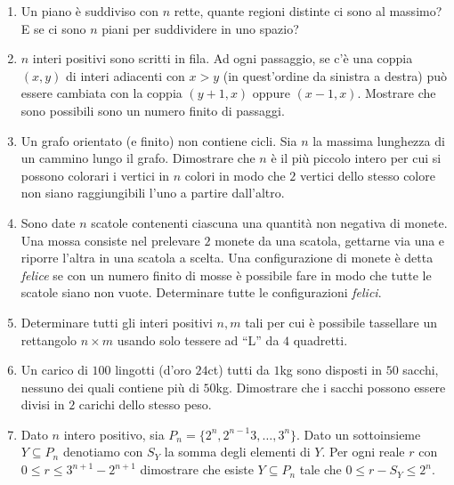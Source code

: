 \documentclass[a4paper,10pt]{article}
\begin{document}
\begin{enumerate}
	Nel mese di febbraio, tocca allo gnome Febbraio fare visita ai
	suoi amici ed eventualmente ridipingere la casetta per
	``adeguarsi alla maggioranza'', e cos\`{\i} via.

	Questa procedura si ripete di anno in anno.  Si dimostri che, da
	un certo momento in poi, nessuno gnomo avr\`{a} pi\`{u} bisogno di
	ridipingere la sua casetta (si supponga l'amicizia simmetrica, e che
	ogni gnomo non includa se stesso nella lista dei suoi amici).

	\item Un piano è suddiviso con $n$ rette, quante regioni distinte ci
	sono al massimo? E se ci sono $n$ piani per suddividere in uno spazio?

	\item $n$ interi positivi sono scritti in fila. Ad ogni passaggio, se c'\`e una coppia $(x,y)$ di interi adiacenti con $x>y$ (in quest'ordine da sinistra a destra) pu\`o essere cambiata con la coppia $(y+1,x)$ oppure $(x-1,x)$. Mostrare che sono possibili sono un numero finito di passaggi.

	\item Un grafo orientato (e finito) non contiene cicli. Sia $n$ la
	massima lunghezza di un cammino lungo il grafo. Dimostrare che $n$ \`e
	il pi\`u piccolo intero per cui si possono colorari i vertici in $n$
	colori in modo che $2$ vertici dello stesso colore non siano
	raggiungibili l'uno a partire dall'altro.

	\item Sono date $n$ scatole contenenti ciascuna una quantit\`a non
	negativa di monete. Una mossa consiste nel prelevare $2$ monete da una
	scatola, gettarne via una e riporre l'altra in una scatola a scelta.
	Una configurazione di monete \`e detta \textit{felice} se con
	un numero finito di mosse \`e possibile fare in modo che tutte
	le scatole siano non vuote. Determinare tutte le configurazioni
	\textit{felici}.
	
	\item Determinare tutti gli interi positivi $n,m$ tali per cui \`e possibile tassellare un rettangolo $n \times m$ usando solo tessere ad ``L'' da $4$ quadretti.

	\item Un carico di $100$ lingotti (d'oro $24$ct) tutti da $1$kg sono
	disposti in $50$ sacchi, nessuno dei quali contiene pi\`u di $50$kg.
	Dimostrare che i sacchi possono essere divisi in $2$ carichi dello
	stesso peso.

	\item Dato $n$ intero positivo, sia $P_n=\{2^n,2^{n-1}3,\dots,3^n\}$.
	Dato un sottoinsieme $Y\subseteq P_n$ denotiamo con $S_Y$ la somma
	degli elementi di $Y$. Per ogni reale $r$ con $0\leq r \leq 3^{n+1} -
	2^{n+1}$ dimostrare che esiste $Y\subseteq P_n$ tale che $0\leq r-S_Y
	\leq 2^n$.

\end{enumerate}
\bigskip\bigskip
\end{document}
